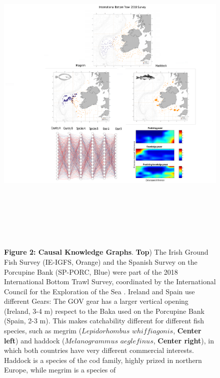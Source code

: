 \documentclass[11pt, a4paper]{article} %
\begin{document}
   \vspace{-0.15 in}
   \begin{figure}[h!]
     \centering
     \hspace{-0.5 in}\includegraphics[width=18cm,height=16cm]{Figures/Figure3integrated.pdf}
     \caption*{\small {\bf Figure 2: Causal Knowledge Graphs}.  {\bf
         Top}) The Irish Ground Fish Survey (IE-IGFS, Orange) and the
       Spanish Survey on the Porcupine Bank (SP-PORC, Blue) were part
       of the 2018 International Bottom Trawl Survey, coordinated by
       the International Council for the Exploration of the Sea
       \citep{ices}. Ireland and Spain use different Gears: The GOV
       gear has a larger vertical opening (Ireland, 3-4 m) respect to
       the Baka used on the Porcupine Bank (Spain, 2-3 m). This makes
       catchability different for different fish species, such as
       megrim ($Lepidorhombus$ $whiffiagonis$, {\bf Center left}) and
       haddock ($Melanogrammus$ $aeglefinus$, {\bf Center right}), in
       which both countries have very different commercial
       interests. Haddock is a species of the cod family, highly
       prized in northern Europe, while megrim is a species of
}
\end{figure}
\end{document}
